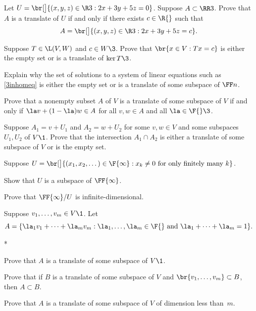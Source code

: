 \exercise
Let $U = \br[\big]{ (x, y, z) \in \R3: 2x + 3y + 5z= 0}$. Suppose $A \subset \RR3$. Prove that $A$ is a translate of $U$ if and only if there exists $c \in \R{}$ such that\label{3translates}
\[
A = \br[\big]{ (x, y, z) \in \R3: 2x + 3y + 5z= c}.
\]
\exercisedisplayend


\exercise
\begin{SUBtheorem}
\item
Suppose $T \in \L(V, W)$ and $c \in W\3$. Prove that $\br{x \in V : Tx = c}$ is either the empty set or is a translate of
$\ker T\3$.

\item
Explain why the set of solutions to a system of linear equations such as \ref{3inhomeq} is either the empty set or is a translate of some subspace of $\FF n$.
\end{SUBtheorem}


\exercise
Prove that a nonempty subset $A$ of $V$ is a translate of some subspace of $V$ if and only if $\la v + (1-\la)w \in A$ for all $v, w \in A$ and all $\la \in \F{}\3$. \label{affine}


\exercise
Suppose $A_1 = v + U_1$ and $A_2 = w + U_2$ for some $v, w \in V$ and some subspaces $U_1, U_2$ of $V\1$. Prove that the intersection $A_1 \cap A_2$ is either a translate of some subspace of $V$ or is the empty set.

\pagebreak[4]


\exercise
Suppose $U = \br[\big]{(x_1, x_2, \dots) \in \F{\infty}: x_k \ne 0\ \text{for only finitely many}\ k}$.
\begin{subtheorem}
\item
Show that $U$ is a subspace of $\FF{\infty}$.
\item
Prove that $\FF{\infty}/U$ is infinite-dimensional.
\end{subtheorem}
\exercisesubtheoremend


\exercise
Suppose $v_1, \dots, v_m \in V\1$. Let
\[
A = \{ \la_1 v_1 + \dots + \la_m v_m : \la_1, \dots, \la_m \in \F{}\ \text{and}\ \la_1 + \dots + \la_m = 1 \}.
\]
\begin{subtheorem}*
\item
Prove that $A$ is a translate of some subspace of $V\1$.
\item
Prove that if $B$ is a translate of some subspace of $V$ and $\br{v_1, \dots, v_m} \subset B$, then $A \subset B$.
\item
Prove that $A$ is a translate of some subspace of $V$ of dimension less than~$m$.
\end{subtheorem}
\exercisesubtheoremend


